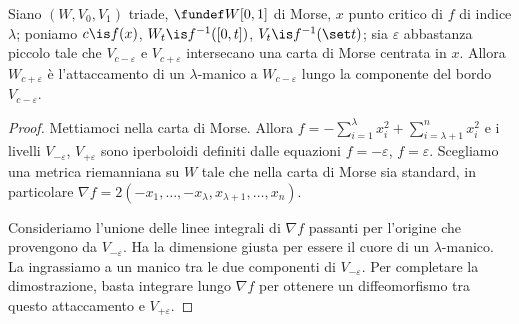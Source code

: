 \begin{teo}
	Siano $(W,V_0,V_1)$ triade, $\fundef W{[0,1]}$ di Morse, $x$ punto critico di $f$ di indice $\lambda$;
	poniamo $c\is f(x)$, $W_t\is f^{-1}([0,t])$, $V_t\is f^{-1}(\set t)$;
	sia $\varepsilon$ abbastanza piccolo tale che $V_{c-\varepsilon}$ e $V_{c+\varepsilon}$ intersecano una carta di Morse centrata in $x$.
	Allora $W_{c+\varepsilon}$ è l'attaccamento di un $\lambda$-manico a $W_{c-\varepsilon}$ lungo la componente del bordo $V_{c-\varepsilon}$.
\end{teo}

\begin{proof}
	Mettiamoci nella carta di Morse.
	Allora $f=-\sum_{i=1}^\lambda x_i^2+\sum_{i=\lambda+1}^n x_i^2$ e i livelli $V_{-\varepsilon}$, $V_{+\varepsilon}$ sono iperboloidi definiti dalle equazioni $f=-\varepsilon$, $f=\varepsilon$.
	Scegliamo una metrica riemanniana su $W$ tale che nella carta di Morse sia standard, in particolare $\nabla f=2(-x_1,\dots,-x_\lambda,x_{\lambda+1},\dots,x_n)$.
	
	Consideriamo l'unione delle linee integrali di $\nabla f$ passanti per l'origine che provengono da $V_{-\varepsilon}$.
	Ha la dimensione giusta per essere il cuore di un $\lambda$-manico.
	La ingrassiamo a un manico tra le due componenti di $V_{-\varepsilon}$.
	Per completare la dimostrazione, basta integrare lungo $\nabla f$ per ottenere un diffeomorfismo tra questo attaccamento e $V_{+\varepsilon}$. 
\end{proof}